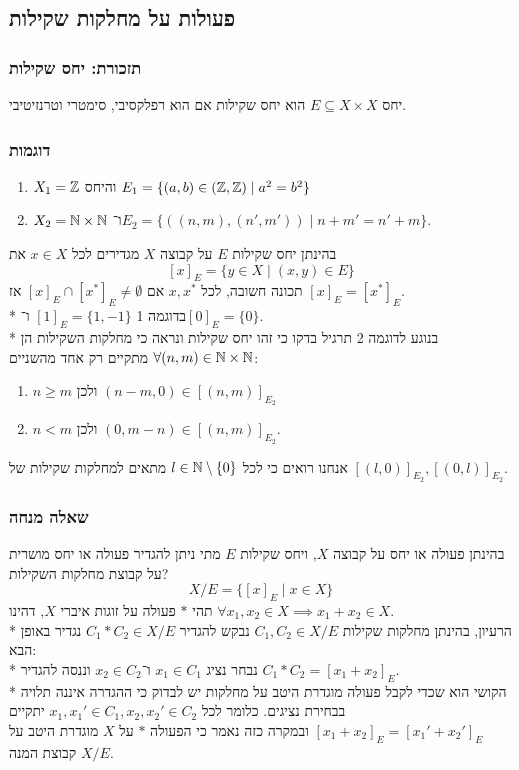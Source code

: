\subsection{פעולות על מחלקות שקילות}
\subsubsection{תזכורת: יחס שקילות}
יחס $E \subseteq X \times X$ הוא יחס שקילות אם הוא רפלקסיבי, סימטרי וטרנזיטיבי.

\subsubsection{דוגמות}
\begin{enumerate}
	\item $X_1 = \mathbb{Z}$ והיחס $E_1 = \{ (a, b) \in (\mathbb{Z}, \mathbb{Z}) \mid a^2 = b^2 \}$
	\item $X_2 = \mathbb{N} \times \mathbb{N}$ ו־$E_2 = \{ ((n, m), (n', m')) \mid n + m' = n' + m \}$.
\end{enumerate}

בהינתן יחס שקילות $E$ על קבוצה $X$ מגדירים לכל $x \in X$ את
\[
	{[x]}_E = \{ y \in X \mid (x, y) \in E\}
\]
תכונה חשובה, לכל $x, x^*$ אם ${[x]}_E \cap {[x^*]}_E \ne \emptyset$ אז ${[x]}_E ={[x^*]}_E$. \\*
בדוגמה 1 ${[1]}_E = \{1, -1 \}$ ו־${[0]}_E = \{ 0 \}$. \\*
בנוגע לדוגמה 2 תרגיל בדקו כי זהו יחס שקילות ונראה כי מחלקות השקילות הן $\forall (n, m) \in \mathbb{N} \times \mathbb{N}$
מתקיים רק אחד מהשניים:
\begin{enumerate}
	\item $n \ge m$ ולכן $(n - m, 0) \in {[(n, m)]}_{E_2}$
	\item $n < m$ ולכן $(0, m - n) \in {[(n, m)]}_{E_2}$.
\end{enumerate}
אנחנו רואים כי לכל $l \in \mathbb{N} \setminus \{0\}$ מתאים למחלקות שקילות של ${[(l, 0)]}_{E_2}, {[(0, l)]}_{E_2}$.

\subsubsection{שאלה מנחה}
בהינתן פעולה או יחס על קבוצה $X$, ויחס שקילות $E$ מתי ניתן להגדיר פעולה או יחס מושרית על קבוצת מחלקות השקילות?
\[
	X / E = \{ {[x]}_E \mid x \in X\}
\]
תהי $*$ פעולה על זוגות איברי $X$, דהינו $\forall x_1, x_2 \in X \implies x_1 + x_2 \in X$.\\*
הרעיון, בהינתן מחלקות שקילות $C_1, C_2 \in X/E$ נבקש להגדיר $C_1 * C_2 \in X/E$ נגדיר באופן הבא: \\*
נבחר נציג $x_1 \in C_1$ ו־$x_2 \in C_2$ וננסה להגדיר $C_1 * C_2 = {[x_1 + x_2]}_E$. \\*
הקושי הוא שכדי לקבל פעולה מוגדרת היטב על מחלקות יש לבדוק כי ההגדרה איננה תלויה בבחירת נציגים.
כלומר לכל $x_1, x_1' \in C_1, x_2, x_2' \in C_2$ יתקיים ${[x_1 + x_2]}_E = {[x_1' + x_2']}_E$ ובמקרה כזה נאמר כי הפעולה $*$ על $X$ מוגדרת היטב על קבוצת המנה $X/E$.

